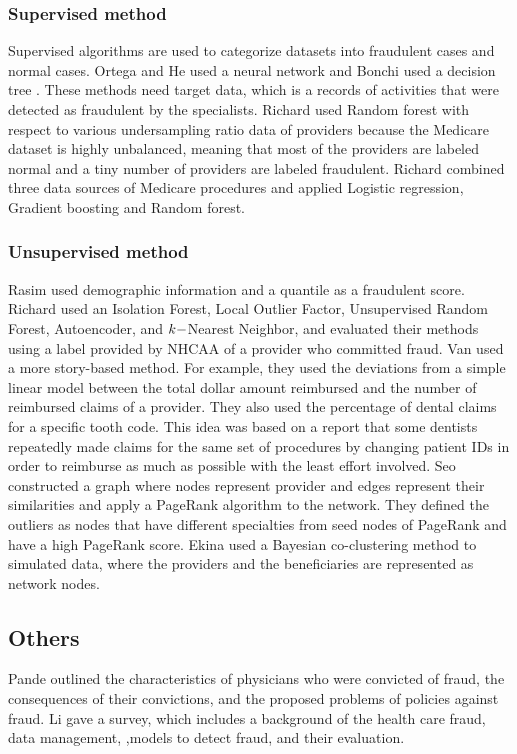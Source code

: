 \documentclass[dvipdfmx, english]{ampmt}             %
\begin{document}
\subsubsection*{Supervised method}
Supervised algorithms are used to categorize datasets into fraudulent cases and normal cases. 
Ortega and He used a neural network\cite{Ortega, Neuralnet} and Bonchi used a decision tree \cite{Bonchi}. These methods need target data, which is a records of activities that were detected as fraudulent by the specialists.
Richard\cite{RichardRF} used Random forest with respect to various undersampling ratio data of providers because the Medicare dataset is highly unbalanced, meaning that most of the providers are labeled normal and a tiny number of providers are labeled fraudulent. 
Richard\cite{RichardMultiple} combined three data sources of Medicare procedures and applied Logistic regression, Gradient boosting and Random forest. 

\subsubsection*{Unsupervised method}
Rasim\cite{TwoModels} used demographic information and a quantile as a fraudulent score.
Richard\cite{RichardUnsupervised} used an Isolation Forest, Local Outlier Factor, Unsupervised Random Forest, Autoencoder, and $k\--$Nearest Neighbor, and evaluated their methods using a label provided by NHCAA of a provider who committed fraud.
Van\cite{Van} used a more story-based method. For example, they used the deviations from a simple linear model between the total dollar amount reimbursed and the number of reimbursed claims of a provider. They also used the percentage of dental claims for a specific tooth code. This idea was based on a report that some dentists repeatedly made claims for the same set of procedures by changing patient IDs in order to reimburse as much as possible with the least effort involved. Seo\cite{Seo2017Identifying} constructed a graph where nodes represent provider and edges represent their similarities and apply a PageRank algorithm to the network. They defined the outliers as nodes that have different specialties from seed nodes of PageRank and have a high PageRank score. Ekina \cite{ekina2013application} used a Bayesian co-clustering method to simulated data, where the providers and the beneficiaries are represented as network nodes.

\subsection*{Others}
Pande\cite{Pande} outlined the characteristics of physicians who were convicted of fraud, the consequences of their convictions, and the proposed problems of policies against fraud.
Li \cite{Survey} gave a survey, which includes a background of the health care fraud, data management, 
,models to detect fraud, and their evaluation.
\end{document}
